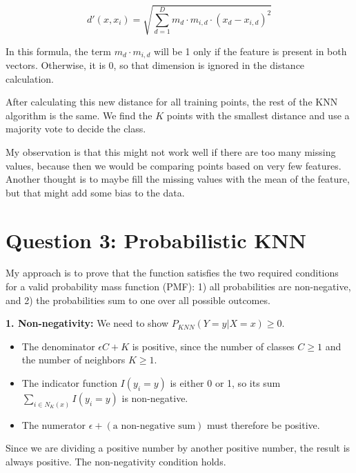 \documentclass[11pt]{article}
\begin{document}
\[
d'(x,x_i) = \sqrt{\sum_{d=1}^{D} m_d \cdot m_{i,d} \cdot (x_d - x_{i,d})^2}
\]

\noindent
In this formula, the term $m_d \cdot m_{i,d}$ will be 1 only if the feature is present in both vectors. Otherwise, it is 0, so that dimension is ignored in the distance calculation.

\medskip
\noindent
After calculating this new distance for all training points, the rest of the KNN algorithm is the same. We find the $K$ points with the smallest distance and use a majority vote to decide the class.

\medskip
\noindent
My observation is that this might not work well if there are too many missing values, because then we would be comparing points based on very few features. Another thought is to maybe fill the missing values with the mean of the feature, but that might add some bias to the data.

\section*{Question 3: Probabilistic KNN}

\noindent
My approach is to prove that the function satisfies the two required conditions for a valid probability mass function (PMF): 1) all probabilities are non-negative, and 2) the probabilities sum to one over all possible outcomes.

\medskip
\noindent
\textbf{1. Non-negativity:}
\noindent
We need to show $P_{KNN}(Y=y|X=x) \geq 0$.
\begin{itemize}
    \item The denominator $\epsilon C + K$ is positive, since the number of classes $C \geq 1$ and the number of neighbors $K \geq 1$.
    \item The indicator function $I(y_i=y)$ is either 0 or 1, so its sum $\sum_{i \in N_K(x)} I(y_i=y)$ is non-negative.
    \item The numerator $\epsilon + (\text{a non-negative sum})$ must therefore be positive.
\end{itemize}
Since we are dividing a positive number by another positive number, the result is always positive. The non-negativity condition holds.
\end{document}
